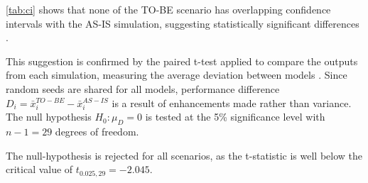 \autoref{tab:ci} shows that none of the TO-BE scenario has overlapping confidence intervals with the AS-IS simulation, suggesting statistically significant differences \parencite[p. 390]{pensumbok}.

This suggestion is confirmed by the paired t-test applied to compare the outputs from each simulation, measuring the average deviation between models \parencite[p. 426-429]{pensumbok}. Since random seeds are shared for all models, performance difference $D_i = \bar{x}_i^{TO-BE} - \bar{x}_i^{AS-IS}$ is a result of enhancements made rather than variance. The null hypothesis $H_0: \mu_D = 0$ is tested at the 5\% significance level with $n - 1 = 29$ degrees of freedom.

The null-hypothesis is rejected for all scenarios, as the t-statistic is well below the critical value of $t_{0.025,29} = -2.045$. 

